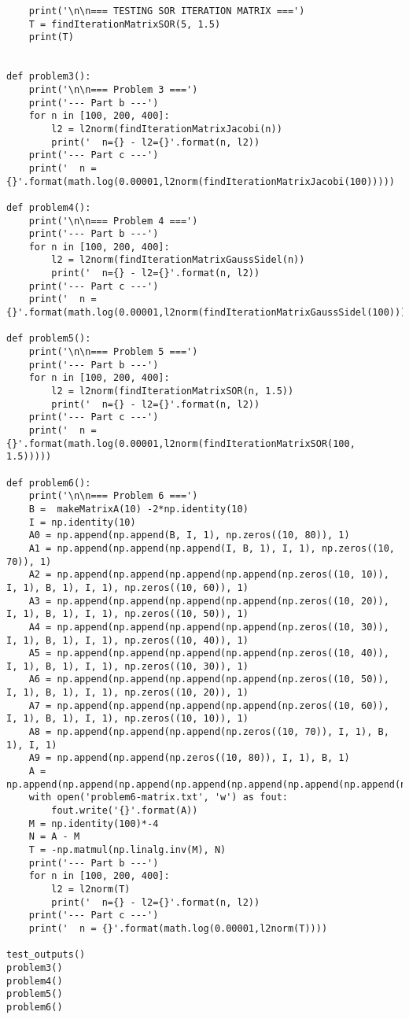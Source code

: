 \documentclass{article}
\begin{document}
\begin{verbatim}
    print('\n\n=== TESTING SOR ITERATION MATRIX ===')
    T = findIterationMatrixSOR(5, 1.5)
    print(T)


def problem3():
    print('\n\n=== Problem 3 ===')
    print('--- Part b ---')
    for n in [100, 200, 400]:
        l2 = l2norm(findIterationMatrixJacobi(n))
        print('  n={} - l2={}'.format(n, l2))
    print('--- Part c ---')
    print('  n = {}'.format(math.log(0.00001,l2norm(findIterationMatrixJacobi(100)))))

def problem4():
    print('\n\n=== Problem 4 ===')
    print('--- Part b ---')
    for n in [100, 200, 400]:
        l2 = l2norm(findIterationMatrixGaussSidel(n))
        print('  n={} - l2={}'.format(n, l2))
    print('--- Part c ---')
    print('  n = {}'.format(math.log(0.00001,l2norm(findIterationMatrixGaussSidel(100)))))

def problem5():
    print('\n\n=== Problem 5 ===')
    print('--- Part b ---')
    for n in [100, 200, 400]:
        l2 = l2norm(findIterationMatrixSOR(n, 1.5))
        print('  n={} - l2={}'.format(n, l2))
    print('--- Part c ---')
    print('  n = {}'.format(math.log(0.00001,l2norm(findIterationMatrixSOR(100, 1.5)))))

def problem6():
    print('\n\n=== Problem 6 ===')
    B =  makeMatrixA(10) -2*np.identity(10)
    I = np.identity(10)
    A0 = np.append(np.append(B, I, 1), np.zeros((10, 80)), 1)
    A1 = np.append(np.append(np.append(I, B, 1), I, 1), np.zeros((10, 70)), 1)
    A2 = np.append(np.append(np.append(np.append(np.zeros((10, 10)), I, 1), B, 1), I, 1), np.zeros((10, 60)), 1)
    A3 = np.append(np.append(np.append(np.append(np.zeros((10, 20)), I, 1), B, 1), I, 1), np.zeros((10, 50)), 1)
    A4 = np.append(np.append(np.append(np.append(np.zeros((10, 30)), I, 1), B, 1), I, 1), np.zeros((10, 40)), 1)
    A5 = np.append(np.append(np.append(np.append(np.zeros((10, 40)), I, 1), B, 1), I, 1), np.zeros((10, 30)), 1)
    A6 = np.append(np.append(np.append(np.append(np.zeros((10, 50)), I, 1), B, 1), I, 1), np.zeros((10, 20)), 1)
    A7 = np.append(np.append(np.append(np.append(np.zeros((10, 60)), I, 1), B, 1), I, 1), np.zeros((10, 10)), 1)
    A8 = np.append(np.append(np.append(np.zeros((10, 70)), I, 1), B, 1), I, 1)
    A9 = np.append(np.append(np.zeros((10, 80)), I, 1), B, 1)
    A = np.append(np.append(np.append(np.append(np.append(np.append(np.append(np.append(np.append(A0,A1,0),A2,0),A3,0),A4,0),A5,0),A6,0),A7,0),A8,0),A9,0)
    with open('problem6-matrix.txt', 'w') as fout:
        fout.write('{}'.format(A))
    M = np.identity(100)*-4
    N = A - M
    T = -np.matmul(np.linalg.inv(M), N)
    print('--- Part b ---')
    for n in [100, 200, 400]:
        l2 = l2norm(T)
        print('  n={} - l2={}'.format(n, l2))
    print('--- Part c ---')
    print('  n = {}'.format(math.log(0.00001,l2norm(T))))

test_outputs()
problem3()
problem4()
problem5()
problem6()

\end{verbatim}
\end{document}
